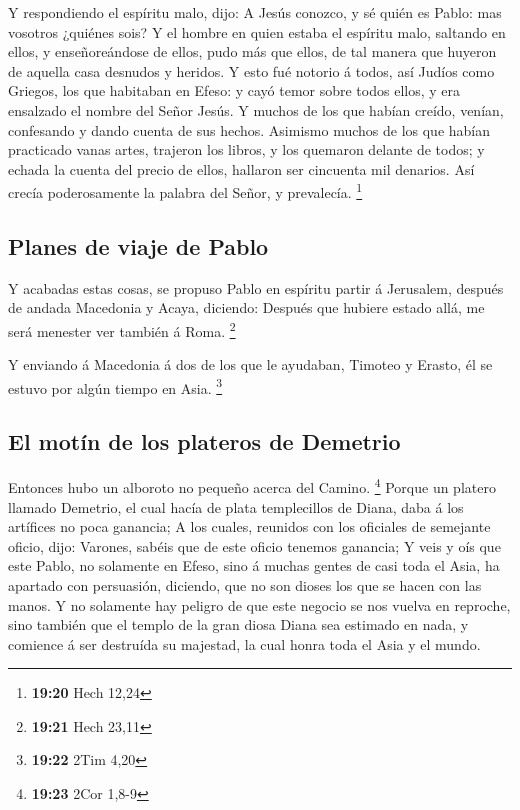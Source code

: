 Y respondiendo el espíritu malo, dijo: A Jesús conozco,
y sé quién es Pablo: mas vosotros ¿quiénes sois?  Y el
hombre en quien estaba el espíritu malo, saltando en ellos, y
enseñoreándose de ellos, pudo más que ellos, de tal manera que huyeron
de aquella casa desnudos y heridos.  Y esto fué notorio á
todos, así Judíos como Griegos, los que habitaban en Efeso: y cayó temor
sobre todos ellos, y era ensalzado el nombre del Señor Jesús.
 Y muchos de los que habían creído, venían, confesando y
dando cuenta de sus hechos.  Asimismo muchos de los que
habían practicado vanas artes, trajeron los libros, y los quemaron
delante de todos; y echada la cuenta del precio de ellos, hallaron ser
cincuenta mil denarios.  Así crecía poderosamente la
palabra del Señor, y prevalecía. \footnote{\textbf{19:20} Hech 12,24}

\hypertarget{planes-de-viaje-de-pablo}{%
\subsection{Planes de viaje de Pablo}\label{planes-de-viaje-de-pablo}}

 Y acabadas estas cosas, se propuso Pablo en espíritu
partir á Jerusalem, después de andada Macedonia y Acaya, diciendo:
Después que hubiere estado allá, me será menester ver también á Roma.
\footnote{\textbf{19:21} Hech 23,11}

 Y enviando á Macedonia á dos de los que le ayudaban,
Timoteo y Erasto, él se estuvo por algún tiempo en Asia. \footnote{\textbf{19:22}
  2Tim 4,20}

\hypertarget{el-motuxedn-de-los-plateros-de-demetrio}{%
\subsection{El motín de los plateros de
Demetrio}\label{el-motuxedn-de-los-plateros-de-demetrio}}

 Entonces hubo un alboroto no pequeño acerca del Camino.
\footnote{\textbf{19:23} 2Cor 1,8-9}  Porque un platero
llamado Demetrio, el cual hacía de plata templecillos de Diana, daba á
los artífices no poca ganancia;  A los cuales, reunidos
con los oficiales de semejante oficio, dijo: Varones, sabéis que de este
oficio tenemos ganancia;  Y veis y oís que este Pablo, no
solamente en Efeso, sino á muchas gentes de casi toda el Asia, ha
apartado con persuasión, diciendo, que no son dioses los que se hacen
con las manos.  Y no solamente hay peligro de que este
negocio se nos vuelva en reproche, sino también que el templo de la gran
diosa Diana sea estimado en nada, y comience á ser destruída su
majestad, la cual honra toda el Asia y el mundo.

